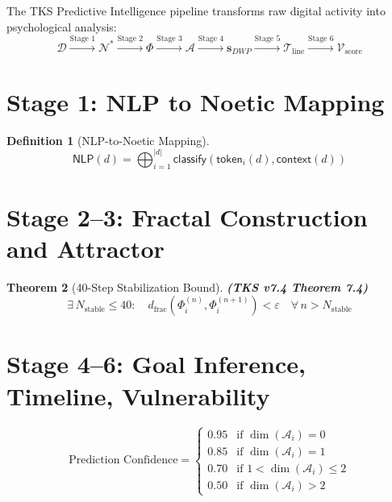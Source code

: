 \documentclass[11pt,twoside]{book}
\newcommand{\Noetics}{\mathcal{N}}
\newcommand{\PsychAttractor}{\mathcal{A}}
\newcommand{\ProfileFrac}{\Phi}
\newcommand{\NLP}{\mathsf{NLP}}
\newcommand{\DigitalTrace}{\mathcal{D}}
\newcommand{\VulnScore}{\mathcal{V}_{\mathrm{score}}}
\newcommand{\Timeline}{\mathcal{T}_{\mathrm{line}}}
\theoremstyle{definition}
\newtheorem{definition}{Definition}[chapter]
\theoremstyle{plain}
\newtheorem{theorem}[definition]{Theorem}
\theoremstyle{remark}
\begin{document}
\begin{tcolorbox}[colback=blue!5!white,colframe=blue!75!black,title=\textbf{Pipeline Architecture},breakable]
The TKS Predictive Intelligence pipeline transforms raw digital activity into psychological analysis:
\begin{equation}
\boxed{
\DigitalTrace \xrightarrow{\text{Stage 1}} \Noetics^*
\xrightarrow{\text{Stage 2}} \ProfileFrac
\xrightarrow{\text{Stage 3}} \PsychAttractor
\xrightarrow{\text{Stage 4}} \mathbf{s}_{DWP}
\xrightarrow{\text{Stage 5}} \Timeline
\xrightarrow{\text{Stage 6}} \VulnScore
}
\end{equation}
\end{tcolorbox}

\section{Stage 1: NLP to Noetic Mapping}

\begin{definition}[NLP-to-Noetic Mapping]
\begin{equation}
\boxed{
    \NLP(d) = \bigoplus_{i=1}^{|d|} \mathsf{classify}\left( \mathsf{token}_i(d), \mathsf{context}(d) \right)
}
\end{equation}
\end{definition}

\section{Stage 2--3: Fractal Construction and Attractor}

\begin{theorem}[40-Step Stabilization Bound]
\textbf{(TKS v7.4 Theorem 7.4)}
\[
    \exists\, N_{\mathrm{stable}} \leq 40 : \quad
    d_{\mathrm{frac}}\left(\ProfileFrac_i^{(n)}, \ProfileFrac_i^{(n+1)}\right) < \varepsilon
    \quad \forall\, n > N_{\mathrm{stable}}
\]
\end{theorem}

\section{Stage 4--6: Goal Inference, Timeline, Vulnerability}

\begin{equation}
\boxed{
    \text{Prediction Confidence} =
    \begin{cases}
        0.95 & \text{if } \dim(\PsychAttractor_i) = 0 \\
        0.85 & \text{if } \dim(\PsychAttractor_i) = 1 \\
        0.70 & \text{if } 1 < \dim(\PsychAttractor_i) \leq 2 \\
        0.50 & \text{if } \dim(\PsychAttractor_i) > 2
    \end{cases}
}
\end{equation}
\end{document}
